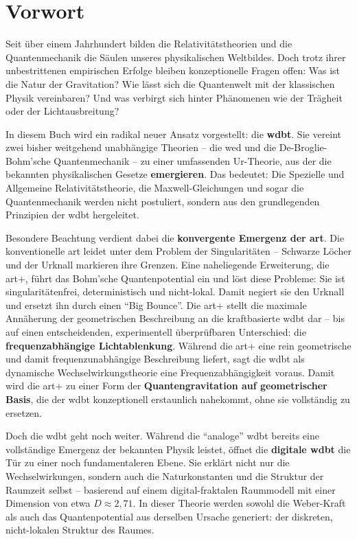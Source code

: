 \documentclass[11pt, a5paper, twoside, openright]{book}
\begin{document}
\chapter*{Vorwort}
Seit über einem Jahrhundert bilden die Relativitätstheorien und die Quantenmechanik die Säulen unseres physikalischen Weltbildes. Doch trotz ihrer unbestrittenen empirischen Erfolge bleiben
konzeptionelle Fragen offen: Was ist die Natur der Gravitation? Wie lässt sich die Quantenwelt mit der klassischen Physik vereinbaren? Und was verbirgt sich hinter Phänomenen wie der Trägheit oder der
Lichtausbreitung?

In diesem Buch wird ein radikal neuer Ansatz vorgestellt: die \textbf{\gls{wdbt}}. Sie vereint zwei bisher weitgehend unabhängige Theorien – die \gls{wed} und die De-Broglie-Bohm’sche Quantenmechanik – zu einer
umfassenden Ur-Theorie, aus der die bekannten physikalischen Gesetze \textbf{emergieren}. Das bedeutet: Die Spezielle und Allgemeine Relativitätstheorie, die Maxwell-Gleichungen und sogar die Quantenmechanik
werden nicht postuliert, sondern aus den grundlegenden Prinzipien der \gls{wdbt} hergeleitet.

Besondere Beachtung verdient dabei die \textbf{konvergente Emergenz der \gls{art}}. Die konventionelle \gls{art} leidet unter dem Problem der Singularitäten – Schwarze Löcher und der Urknall markieren ihre
Grenzen. Eine naheliegende Erweiterung, die \gls{art}+, führt das Bohm’sche Quantenpotential ein und löst diese Probleme: Sie ist singularitätenfrei, deterministisch und nicht-lokal. Damit negiert sie
den Urknall und ersetzt ihn durch einen \enquote{Big Bounce}. Die \gls{art}+ stellt die maximale Annäherung der geometrischen Beschreibung an die kraftbasierte \gls{wdbt} dar – bis auf einen
entscheidenden, experimentell überprüfbaren Unterschied: die \textbf{frequenzabhängige Lichtablenkung}. Während die \gls{art}+ eine rein geometrische und damit frequenzunabhängige Beschreibung liefert, sagt die
\gls{wdbt} als dynamische Wechselwirkungstheorie eine Frequenzabhängigkeit voraus. Damit wird die \gls{art}+ zu einer Form der \textbf{Quantengravitation auf geometrischer Basis}, die der \gls{wdbt} konzeptionell
erstaunlich nahekommt, ohne sie vollständig zu ersetzen.

Doch die \gls{wdbt} geht noch weiter. Während die \enquote{analoge} \gls{wdbt} bereits eine vollständige Emergenz der bekannten Physik leistet, öffnet die \textbf{digitale \gls{wdbt}} die Tür zu einer
noch fundamentaleren Ebene. Sie erklärt nicht nur die Wechselwirkungen, sondern auch die Naturkonstanten und die Struktur der Raumzeit selbst – basierend auf einem digital-fraktalen Raummodell mit einer
Dimension von etwa $D \approx 2,71$. In dieser Theorie werden sowohl die Weber-Kraft als auch das Quantenpotential aus derselben Ursache generiert: der diskreten, nicht-lokalen Struktur des Raumes.
\end{document}
